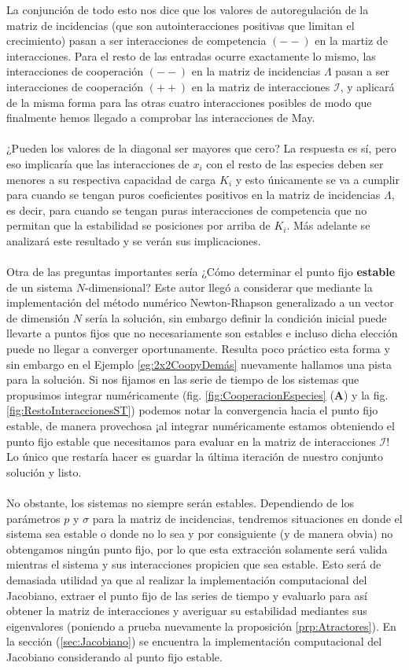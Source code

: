 La conjunción de todo esto nos dice que los valores de autoregulación de la matriz de incidencias (que son autointeracciones positivas que limitan el crecimiento) pasan a ser interacciones de competencia $(--)$ en la martiz de interacciones. Para el resto de las entradas ocurre exactamente lo mismo, las interacciones de cooperación $(--)$ en la matriz de incidencias $\Lambda$ pasan a ser interacciones de cooperación $(++)$ en la matriz de interacciones $\mathcal{I}$, y aplicará de la misma forma para las otras cuatro interacciones posibles de modo que finalmente hemos llegado a comprobar las interacciones de May.\\
\\
¿Pueden los valores de la diagonal ser mayores que cero? La respuesta es sí, pero eso implicaría que las interacciones de $x_i$ con el resto de las especies deben ser menores a su respectiva capacidad de carga $K_i$ y esto únicamente se va a cumplir para cuando se tengan puros coeficientes positivos en la matriz de incidencias $\Lambda$, es decir, para cuando se tengan puras interacciones de competencia que no permitan que la estabilidad se posiciones por arriba de $K_i$. Más adelante se analizará este resultado y se verán sus implicaciones.\\
\\
Otra de las preguntas importantes sería ¿Cómo determinar el punto fijo \textbf{estable} de un sistema $N$-dimensional? Este autor llegó a considerar que mediante la implementación del método numérico Newton-Rhapson generalizado a un vector de dimensión $N$ sería la solución, sin embargo definir la condición inicial puede llevarte a puntos fijos que no necesariamente son estables e incluso dicha elección puede no llegar a converger oportunamente. Resulta poco práctico esta forma y sin embargo en el Ejemplo \ref{eg:2x2CoopyDemás} nuevamente hallamos una pista para la solución. Si nos fijamos en las serie de tiempo de los sistemas que propusimos integrar numéricamente (fig. \ref{fig:CooperacionEspecies} (\textbf{A}) y la fig. \ref{fig:RestoInteraccionesST}) podemos notar la convergencia hacia el punto fijo estable, de manera provechosa ¡al integrar numéricamente estamos obteniendo el punto fijo estable que necesitamos para evaluar en la matriz de interacciones $\mathcal{I}$! Lo único que restaría hacer es guardar la última iteración de nuestro conjunto solución y listo.\\
\\
No obstante, los sistemas no siempre serán estables. Dependiendo de los parámetros $p$ y $\sigma$ para la matriz de incidencias, tendremos situaciones en donde el sistema sea estable o donde no lo sea y por consiguiente (y de manera obvia) no obtengamos ningún punto fijo, por lo que esta extracción solamente será valida mientras el sistema y sus interacciones propicien que sea estable. Esto será de demasiada utilidad ya que al realizar la implementación computacional del Jacobiano, extraer el punto fijo de las series de tiempo y evaluarlo para así obtener la matriz de interacciones y averiguar su estabilidad mediantes sus eigenvalores (poniendo a prueba nuevamente la proposición \ref{prp:Atractores}). En la sección (\ref{sec:Jacobiano}) se encuentra la implementación computacional del Jacobiano considerando al punto fijo estable.
